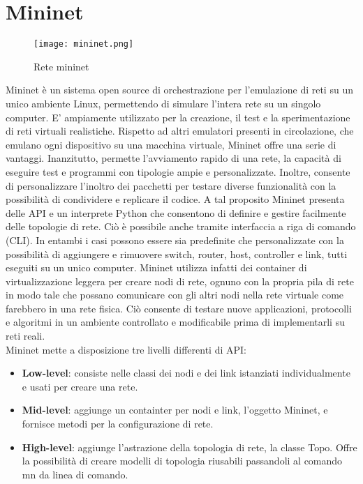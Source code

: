 \section{Mininet}
\begin{figure}[h]
    \centering
   \texttt{[image: mininet.png]}
    \caption{Rete mininet}
    \label{fig:mininet}
\end{figure}
Mininet \cite{mininet} è un sistema open source di orchestrazione per l'emulazione di reti su un unico ambiente Linux, permettendo di simulare l'intera rete su un singolo computer.
E' ampiamente utilizzato per la creazione, il test e la sperimentazione di reti virtuali realistiche.
Rispetto ad altri emulatori presenti in circolazione, che emulano ogni dispositivo su una macchina virtuale, Mininet offre una serie di vantaggi. 
Inanzitutto, permette l'avviamento rapido di una rete, la capacità di eseguire test e programmi con tipologie ampie e personalizzate. 
Inoltre, consente di personalizzare l'inoltro dei pacchetti per testare diverse funzionalità con la possibilità di condividere e replicare il codice.
A tal proposito Mininet presenta delle API e un interprete Python che consentono di definire e gestire facilmente delle topologie di rete.
Ciò è possibile anche tramite interfaccia a riga di comando (CLI). In entambi i casi possono essere sia predefinite che personalizzate con la possibilità di 
aggiungere e rimuovere switch, router, host, controller e link, tutti eseguiti su un unico computer.
Mininet utilizza infatti dei container di virtualizzazione leggera per creare nodi di rete, ognuno con la propria pila di rete in modo tale che possano comunicare con gli 
altri nodi nella rete virtuale come farebbero in una rete fisica. 
Ciò consente di testare nuove applicazioni, protocolli e algoritmi in un ambiente controllato e modificabile prima di implementarli su reti reali.
\\Mininet mette a disposizione tre livelli differenti di API:
\begin{itemize}
\item \textbf{Low-level}: consiste nelle classi dei nodi e dei link istanziati individualmente e usati per creare una rete.
\item \textbf{Mid-level}: aggiunge un containter per nodi e link, l'oggetto Mininet, e fornisce metodi per la configurazione di rete.
\item \textbf{High-level}: aggiunge l'astrazione della topologia di rete, la classe Topo. Offre la possibilità di creare modelli di topologia riusabili passandoli al comando mn da linea di comando.
\end{itemize}

